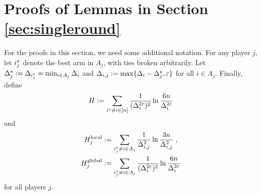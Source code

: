 \documentclass[12pt]{article}
\begin{document}





%












\ifdefined\isconf
\else

\appendix

\section{Proofs of Lemmas in Section \ref{sec:singleround}}

For the proofs in this section, we need some additional notation.
For any player $j$, let $i^\star_j$ denote the best arm in $A_j$, with ties broken arbitrarily. 
Let $\Delta^\star_j := \Delta_{i^\star_j} = \min_{i \in A_j} \Delta_i$ and $\Delta_{i,j} := \max\{ \Delta_i - \Delta_j^\star, \varepsilon \}$ for all $i \in A_j$.
Finally, define
\begin{align*}
	H
	:= \sum_{i^\star \ne i \in [n]}
		\frac{1}{(\Delta_i^{2\varepsilon})^2} \ln \frac{6n}{\Delta_i^{2\varepsilon}}
\end{align*}
and
\begin{align*}
	H_j^{\text{local}}
	&:= \sum_{i^\star_j \ne i \in A_j}
		\frac{1}{\Delta_{i,j}^2} \ln \frac{3n}{\Delta_{i,j}^2}
	\;,\\
	H_j^{\text{global}}
	&:= \sum_{i^\star_j \ne i \in A_j}
		\frac{1}{(\Delta_i^{2\varepsilon})^2} \ln \frac{6n}{\Delta_i^{2\varepsilon}}
\end{align*}
for all players $j$.
\end{document}
